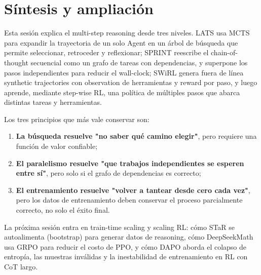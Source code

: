 \section{Síntesis y ampliación}

Esta sesión explica el multi-step reasoning desde tres niveles. LATS usa MCTS para expandir la trayectoria de un solo Agent en un árbol de búsqueda que permite seleccionar, retroceder y reflexionar; SPRINT reescribe el chain-of-thought secuencial como un grafo de tareas con dependencias, y superpone los pasos independientes para reducir el wall-clock; SWiRL genera fuera de línea synthetic trajectories con observation de herramientas y reward por paso, y luego aprende, mediante step-wise RL, una política de múltiples pasos que abarca distintas tareas y herramientas.

Los tres principios que más vale conservar son:

\begin{enumerate}
    \item \textbf{La búsqueda resuelve "no saber qué camino elegir"}, pero requiere una función de valor confiable;
    \item \textbf{El paralelismo resuelve "que trabajos independientes se esperen entre sí"}, pero solo si el grafo de dependencias es correcto;
    \item \textbf{El entrenamiento resuelve "volver a tantear desde cero cada vez"}, pero los datos de entrenamiento deben conservar el proceso parcialmente correcto, no solo el éxito final.
\end{enumerate}

La próxima sesión entra en train-time scaling y scaling RL: cómo STaR se autoalimenta (bootstrap) para generar datos de reasoning, cómo DeepSeekMath usa GRPO para reducir el costo de PPO, y cómo DAPO aborda el colapso de entropía, las muestras inválidas y la inestabilidad de entrenamiento en RL con CoT largo.


